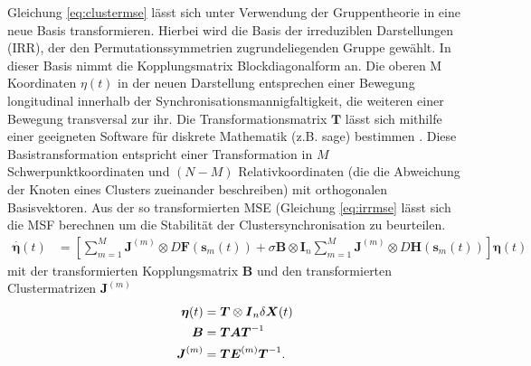 Gleichung \ref{eq:clustermse} lässt sich unter Verwendung der Gruppentheorie in eine neue Basis transformieren\cite{pecora2014}. Hierbei wird die Basis der irreduziblen Darstellungen (IRR), der den Permutationssymmetrien zugrundeliegenden Gruppe gewählt. In dieser Basis nimmt die Kopplungsmatrix Blockdiagonalform an. Die oberen M Koordinaten $\eta(t)$ in der neuen Darstellung entsprechen einer Bewegung longitudinal innerhalb der Synchronisationsmannigfaltigkeit, die weiteren einer Bewegung transversal zur ihr. Die Transformationsmatrix $\boldsymbol{T}$ lässt sich mithilfe einer geeigneten Software für diskrete Mathematik (z.B. sage) bestimmen \citep{sagenotebook}. Diese Basistransformation entspricht einer Transformation in $M$ Schwerpunktkoordinaten und $(N-M)$ Relativkoordinaten (die die Abweichung der Knoten eines Clusters zueinander beschreiben) mit orthogonalen Basisvektoren.
Aus der so transformierten MSE (Gleichung \ref{eq:irrmse} lässt sich die MSF berechnen um die Stabilität der Clustersynchronisation zu beurteilen.
\begin{align}
	\label{eq:irrmse}
		\overset{\cdot}{\boldsymbol{\eta}}(t)&=
				\left[\sum_{m=1}^{M} \boldsymbol{J}^{(m)} \otimes D\boldsymbol{F}(\boldsymbol{s}_m(t))+\sigma\boldsymbol{B}\otimes \boldsymbol{I}_n\sum_{m=1}^{M} \boldsymbol{J}^{(m)}\otimes D\boldsymbol{H}(\boldsymbol{s}_m(t))\right]\boldsymbol{\eta}(t)
		\end{align}
		mit der transformierten Kopplungsmatrix $\boldsymbol{B}$ und den transformierten Clustermatrizen $\boldsymbol{J}^{(m)}$
		\begin{align}
				 \boldsymbol{\eta}(t)&=\boldsymbol{T}\otimes\boldsymbol{I}_n\delta\boldsymbol{X}(t)
				\\\notag \boldsymbol{B}&=\boldsymbol{T}\boldsymbol{A}\boldsymbol{T}^{-1}
				\\\notag \boldsymbol{J}^{(m)}&=\boldsymbol{T}\boldsymbol{E}^{(m)}\boldsymbol{T}^{-1}.
		\end{align}
		




